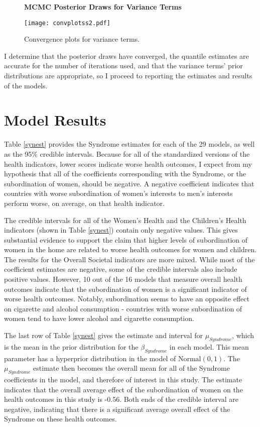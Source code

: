 \begin{figure}[H]
\renewcommand\thefigure{3.2}
\centering
\textbf{MCMC Posterior Draws for Variance Terms}\par\medskip
\centering
  \texttt{[image: convplotss2.pdf]}
  \caption{Convergence plots for variance terms.}
  \label{convplotss2}
\end{figure}

I determine that the posterior draws have converged, the quantile estimates are accurate for the number of iterations used, and that the variance terms' prior distributions are appropriate, so I proceed to reporting the estimates and results of the models. 

\section{Model Results}

Table \ref{synest} provides the Syndrome estimates for each of the 29 models, as well as the 95\% credible intervals. Because for all of the standardized versions of the health indicators, lower scores indicate worse health outcomes, I expect from my hypothesis that all of the coefficients corresponding with the Syndrome, or the subordination of women, should be negative. A negative coefficient indicates that countries with worse subordination of women's interests to men's interests perform worse, on average, on that health indicator.

The credible intervals for all of the Women's Health and the Children's Health indicators (shown in Table \ref{synest}) contain only negative values. This gives substantial evidence to support the claim that higher levels of subordination of women in the home are related to worse health outcomes for women and children. The results for the Overall Societal indicators are more mixed. While most of the coefficient estimates are negative, some of the credible intervals also include positive values. However, 10 out of the 16 models that measure overall health outcomes indicate that the subordination of women is a significant indicator of worse health outcomes. Notably, subordination seems to have an opposite effect on cigarette and alcohol consumption - countries with worse subordination of women tend to have lower alcohol and cigarette consumption.

The last row of Table \ref{synest} gives the estimate and interval for $\mu_{Syndrome}$, which is the mean in the prior distribution for the $\beta_{Syndrome}$ in each model. This mean parameter has a hyperprior distribution in the model of $\text{Normal}(0,1)$. The $\mu_{Syndrome}$ estimate then becomes the overall mean for all of the Syndrome coefficients in the model, and therefore of interest in this study. The estimate indicates that the overall average effect of the subordination of women on the health outcomes in this study is -0.56. Both ends of the credible interval are negative, indicating that there is a significant average overall effect of the Syndrome on these health outcomes. 

